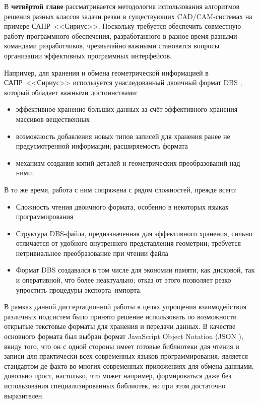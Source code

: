
В {\bf четвёртой главе}
рассматривается методология
использования алгоритмов решения
разных классов задачи резки в существующих
CAD/CAM-системах на примере
САПР~<<Сириус>>.
Поскольку требуется обеспечить
совместную работу программного обеспечения,
разработанного в разное время разными командами разработчиков,
чрезвычайно важными становятся вопросы
организации эффективных программных интерфейсов.

Например, для хранения и обмена геометрической информацией
в САПР~<<Сириус>>
используется унаследованный двоичный формат DBS
\autocite{bi:DBS},
который обладает важными достоинствами:
\begin{itemize}
  \item
  эффективное хранение больших данных за счёт эффективного хранения массивов вещественных
  \item
  возможность добавления новых типов записей для хранения ранее не предусмотренной информации;
  расширяемость формата
  \item
  механизм создания копий деталей и геометрических преобразований над ними.
\end{itemize}

В то же время,
работа с ним сопряжена с рядом сложностей,
прежде всего:
\begin{itemize}
  \item
  Сложность чтения двоичного формата,
  особенно в некоторых языках программирования
  \item
  Структура DBS-файла,
  предназначенная для эффективного хранения,
  сильно отличается от удобного внутреннего представления
  геометрии;
  требуется нетривиальное преобразование при чтении файла
  \item
  Формат DBS создавался в том числе для экономии памяти,
  как дисковой, так и оперативной,
  что более неактуально;
  отказ от этого позволяет резко упростить процедуры экспорта--импорта.
\end{itemize}

В рамках данной диссертационной работы
в целях упрощения взаимодействия различных подсистем
было принято решение использовать по возможности
открытые текстовые форматы для хранения и передачи данных.
В качестве основного формата был выбран формат
JavaScript Object Notation
(JSON
\autocite{bi:JSON}),
ввиду того, что
он с одной стороны имеет готовые библиотеки для чтения и записи
для практически всех современных языков
программирования,
является стандартом де-факто во многих
современных приложениях для обмена данными,
довольно прост,
настолько, что может например,
формироваться даже без использования специализированных библиотек,
но при этом достаточно выразителен.

